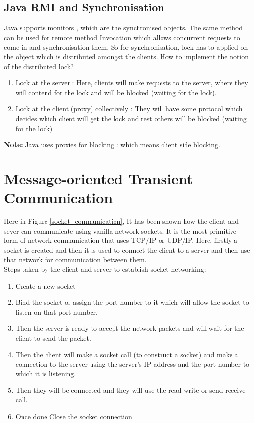 \documentclass[twoside]{article}
\begin{document}
\subsection{Java RMI and Synchronisation}
Java supports monitors , which are the synchronised objects. The same method can be used for remote method Invocation which allows concurrent requests to come in and synchronisation them. So for synchronisation, lock has to applied on the object which is distributed amongst the clients. How to implement the notion of the distributed lock? 
\begin{enumerate}
\item Lock at the server :  Here, clients will make requests to the server, where they will contend for the lock and will be blocked (waiting for the lock).
\item Lock at the client (proxy) collectively : They will have some protocol which decides which client will get the lock and rest others will be blocked (waiting for the lock)
\end{enumerate}

\textbf{Note:} Java uses proxies for blocking : which means client side blocking.

\section{Message-oriented Transient Communication}

Here in Figure \ref{socket_communication}, It has been shown how the client and sever can communicate using vanilla network sockets. It is the most primitive form of network communication that uses TCP/IP or UDP/IP. Here, firstly a socket is created and then it is used to connect the client to a server and then use that network for communication between them. \\
Steps taken by the client and server to establish socket networking:
\begin{enumerate}
\item Create a new socket
\item Bind the socket or assign the port number to it which will allow the socket to listen on that port number.
\item Then the server is ready to accept the network packets and will wait for the client to send the packet.
\item Then the client will make a socket call (to construct a socket) and make a connection to the server using the server's IP address and the port number to which it is listening.
\item Then they will be connected and they will use the read-write or send-receive call.
\item Once done Close the socket connection
\end{enumerate}
\end{document}

